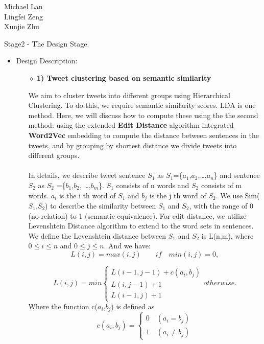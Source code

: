 \documentclass[10pt]{article}
\begin{document}
\begin{raggedright}
Michael Lan \\
Lingfei Zeng \\
Xunjie Zhu \\
\end{raggedright}

\vspace{5mm} 

Stage2 - The Design Stage. 
\begin{itemize} 
\item{ Design Description:\\} 
\begin{itemize}
The user is given 3 different similarity measures for searching. We will begin with the first similarity measure, which allows users to find tweets clusters related to search term inputs.
(Search phrase and retrieve tweets with similar phrases acc to edit distance)

\item[$\diamond$]{\bf1) Tweet clustering based on semantic similarity}

We aim to cluster tweets into different groups using Hierarchical Clustering. To do this, we require semantic similarity scores. LDA is one method. Here, we will discuss how to compute these using the the second method: using the extended {\bf Edit Distance} algorithm integrated {\bf Word2Vec} embedding to compute the distance between sentences in the tweets, and by grouping by shortest distance we divide tweets into different groups. \\\\
In details, we describe tweet sentence $S_1$ as $S_1$=\{$a_1$,$a_2$,…,$a_n$\} and sentence $S_2$ as $S_2$ =\{$b_1$,$b_2$, …,$b_m$\}. $S_1$ consists of n words and $S_2$ consists of m words. $a_i$ is the i th word of $S_1$ and $b_j$ is the j th word of $S_2$. We use Sim($S_1$,$S_2$) to describe the similarity between $S_1$ and $S_2$, with the range of 0 (no relation) to 1 (semantic equivalence). For edit distance, we utilize Levenshtein Distance algorithm to extend to the word sets in sentences. We define the Levenshtein distance between $S_1$ and $S_2$ is L(n,m), where  \(0\leq i\leq n\) and \(0\leq j\leq n\). And we have: \[L(i, j) = max(i, j)  \qquad   if \quad min(i,j)=0, \]  

$$
L(i, j) = min
\left\{
\begin{array}{ll}
L(i-1, j-1) + c(a_i,b_j) \\
L(i, j-1) +1 \\
L(i-1, j) +1
\end{array}
\right.
otherwise.
$$
Where the function c($a_i$,$b_j$) is defined as
$$
c(a_i, b_j)=
\left\{
\begin{array}{ll}
0 \quad (a_i = b_j) \\
1 \quad (a_i \neq b_j)
\end{array}
\right.
$$


\end{itemize}
\end{itemize}
\end{document}

